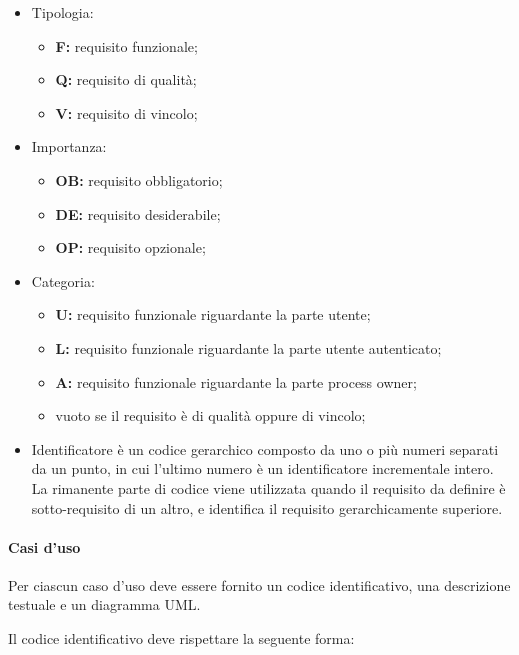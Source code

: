 \begin{itemize}

\item Tipologia:
\begin{itemize}
\item \textbf{F:} requisito funzionale;
\item \textbf{Q:} requisito di qualità;
\item \textbf{V:} requisito di vincolo;
\end{itemize}

\item Importanza:
\begin{itemize}
\item \textbf{OB:} requisito obbligatorio;
\item \textbf{DE:} requisito desiderabile;
\item \textbf{OP:} requisito opzionale;
\end{itemize}


\item Categoria:
\begin{itemize}
\item \textbf{U:} requisito funzionale riguardante la parte utente;
\item \textbf{L:} requisito funzionale riguardante la parte utente autenticato;
\item \textbf{A:} requisito funzionale riguardante la parte process owner;
\item vuoto se il requisito è di qualità oppure di vincolo;
\end{itemize}


\item Identificatore è un codice gerarchico composto da uno o più numeri separati da un punto, in cui l'ultimo numero è un identificatore incrementale intero.\\
La rimanente parte di codice viene utilizzata quando il requisito da definire è sotto-requisito di un altro, e identifica il requisito gerarchicamente superiore.

\end{itemize}

\paragraph{Casi d'uso}
Per ciascun caso d'uso deve essere fornito un codice identificativo, una descrizione testuale e un diagramma UML.

\begin{flushleft}
Il codice identificativo deve rispettare la seguente forma:
\end{flushleft}

